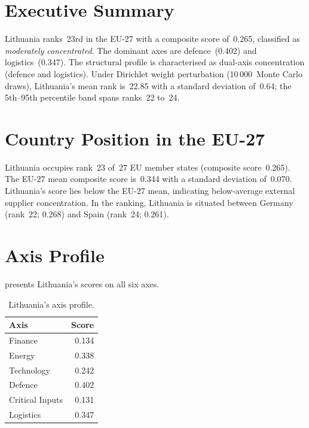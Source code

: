 \documentclass[12pt,a4paper]{article}
\begin{document}
\hypersetup{pageanchor=true}
\pagestyle{fancy}
\renewcommand{\headrulewidth}{0.4pt}


\section{Executive Summary}
\label{sec:summary}

Lithuania ranks~23rd in the EU-27 with a composite \ISI score of~0.265, classified as \emph{moderately concentrated}.  The dominant axes are defence~(0.402) and logistics~(0.347).  The structural profile is characterised as dual-axis concentration (defence and logistics).  Under Dirichlet weight perturbation (10\,000~Monte Carlo draws), Lithuania's mean rank is~22.85 with a standard deviation of~0.64; the 5th--95th percentile band spans ranks~22 to~24.


\section{Country Position in the EU-27}
\label{sec:position}

Lithuania occupies rank~23 of~27 EU member states (composite score~0.265).  The EU-27 mean composite score is~0.344 with a standard deviation of~0.070.  Lithuania's score lies below the EU-27 mean, indicating below-average external supplier concentration.  In the ranking, Lithuania is situated between Germany (rank~22; 0.268) and Spain (rank~24; 0.261).


\section{Axis Profile}
\label{sec:axis-profile}

 presents Lithuania's scores on all six \ISI axes.

\begin{table}[htbp]
\centering\small
\caption{Lithuania's \ISI axis profile.}
\label{tab:axis-profile}
\begin{tabular}{@{}lr@{}}
\toprule
\textbf{Axis} & \textbf{Score} \\
\midrule
    Finance           & 0.134 \\
    Energy            & 0.338 \\
    Technology        & 0.242 \\
    Defence           & 0.402 \\
    Critical Inputs   & 0.131 \\
    Logistics         & 0.347 \\
\bottomrule
\end{tabular}
\end{table}
\end{document}

